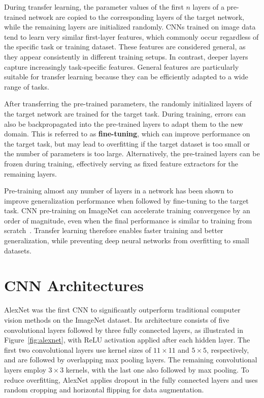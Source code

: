 During transfer learning, the parameter values of the first $n$ layers of a pre-trained network are copied to the corresponding layers of the target network, while the remaining layers are initialized randomly. CNNs trained on image data tend to learn very similar first-layer features, which commonly occur regardless of the specific task or training dataset. These features are considered general, as they appear consistently in different training setups. In contrast, deeper layers capture increasingly task-specific features. General features are particularly suitable for transfer learning because they can be efficiently adapted to a wide range of tasks.

After transferring the pre-trained parameters, the randomly initialized layers of the target network are trained for the target task. During training, errors can also be backpropagated into the pre-trained layers to adapt them to the new domain. This is referred to as \textbf{fine-tuning}, which can improve performance on the target task, but may lead to overfitting if the target dataset is too small or the number of parameters is too large. Alternatively, the pre-trained layers can be frozen during training, effectively serving as fixed feature extractors for the remaining layers.

Pre-training almost any number of layers in a network has been shown to improve generalization performance when followed by fine-tuning to the target task. CNN pre-training on ImageNet can accelerate training convergence by an order of magnitude, even when the final performance is similar to training from scratch~\cite{Kornblith2019}. Transfer learning therefore enables faster training and better generalization, while preventing deep neural networks from overfitting to small datasets.~\cite{Yosinski2014}


\section{CNN Architectures}
AlexNet was the first CNN to significantly outperform traditional computer vision methods on the ImageNet dataset. Its architecture consists of five convolutional layers followed by three fully connected layers, as illustrated in Figure~\ref{fig:alexnet}, with ReLU activation applied after each hidden layer. The first two convolutional layers use kernel sizes of $11 \times 11$ and $5 \times 5$, respectively, and are followed by overlapping max pooling layers. The remaining convolutional layers employ $3 \times 3$ kernels, with the last one also followed by max pooling. To reduce overfitting, AlexNet applies dropout in the fully connected layers and uses random cropping and horizontal flipping for data augmentation.~\cite{Krizhevsky2012}

